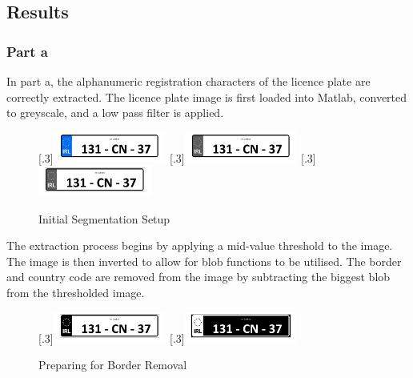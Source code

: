 \documentclass[a4paper]{article}
\begin{document}
	\subsection{Results}
	\subsubsection{Part a}
	In part a, the alphanumeric registration characters of the licence plate
	are correctly extracted. The licence plate image is first loaded into
	Matlab, converted to greyscale, and a low pass filter is applied.
	\begin{figure}[H]
		\centering
		[.3\linewidth]{\includegraphics[height=1cm]{Results/Q2/NumPlate1/qanumber_plate_1.jpg}}%
		[.3\linewidth]{\includegraphics[height=1cm]{Results/Q2/NumPlate1/qanumber_plate_1Grey.jpg}}%
		[.3\linewidth]{\includegraphics[height=1cm]{Results/Q2/NumPlate1/qanumber_plate_1Low.jpg}}%
		\caption{Initial Segmentation Setup}
		\label{fig:}
	\end{figure}
	\par The extraction process begins by applying a mid-value threshold to the
	image. The image is then inverted to allow for blob functions to be
	utilised. The border and country code are removed from the image by
	subtracting the biggest blob from the thresholded image.
	\begin{figure}[H]
		\centering
		[.3\linewidth]{\includegraphics[height=1cm]{Results/Q2/NumPlate1/qanumber_plate_1Mid.jpg}}%
		[.3\linewidth]{\includegraphics[height=1cm]{Results/Q2/NumPlate1/qanumber_plate_1Not.jpg}}%
		\caption{Preparing for Border Removal}
		\label{fig:}
	\end{figure}
\end{document}
